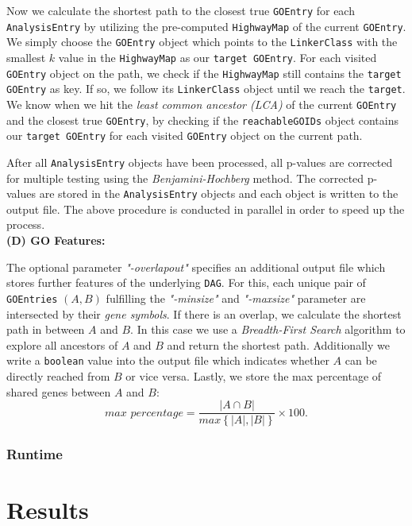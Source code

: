 \documentclass[12pt]{article}
\begin{document}
Now we calculate the shortest path to the closest true \texttt{GOEntry} for each \texttt{AnalysisEntry}
by utilizing the pre-computed \texttt{HighwayMap} of the current \texttt{GOEntry}.
We simply choose the \texttt{GOEntry} object which points to the \texttt{LinkerClass}
with the smallest $k$ value in the \texttt{HighwayMap} as our \texttt{target GOEntry}. 
For each visited \texttt{GOEntry} object on the path, we check
if the \texttt{HighwayMap} still contains the \texttt{target GOEntry} as key.
If so, we follow its \texttt{LinkerClass} object until we reach the \texttt{target}.
We know when we hit the \textit{least common ancestor (LCA)} of the current \texttt{GOEntry}
and the closest true \texttt{GOEntry},
by checking if the \texttt{reachableGOIDs} object contains our \texttt{target GOEntry}
for each visited \texttt{GOEntry} object on the current path.

After all \texttt{AnalysisEntry} objects have been processed, 
all p-values are corrected for multiple testing using the \textit{Benjamini-Hochberg}
method. The corrected p-values are stored in the \texttt{AnalysisEntry} objects
and each object is written to the output file.
The above procedure is conducted in parallel in order to speed up the process.
\hspace{1mm}\\
\textbf{(D) GO Features:}

The optional parameter \textit{"-overlapout"} specifies an additional 
output file which stores further features of the underlying \texttt{DAG}.
For this, each unique pair of \texttt{GOEntries} $(A,B)$ fulfilling the
\textit{"-minsize"} and \textit{"-maxsize"} parameter are 
intersected by their \textit{gene symbols}. If there is an overlap,
we calculate the shortest path in between $A$ and $B$.
In this case we use a \textit{Breadth-First Search} algorithm
to explore all ancestors of $A$ and $B$ and return the shortest path.
Additionally we write a \texttt{boolean} value into the output file
which indicates whether $A$ can be directly reached from $B$ or vice versa.
Lastly, we store the max percentage of shared genes between $A$ and $B$:
\[
    \textit{max percentage} = \frac{|A \cap B|}{\textit{max}\left\{|A|, |B|\right\}} \times 100
.\]


\subsubsection{Runtime}\label{sec:Runtime}
\section{Results}
\end{document}
